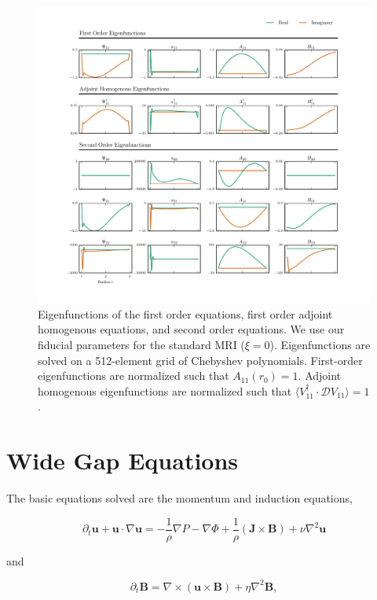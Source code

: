 \documentclass{emulateapj}
\newcommand{\beq}{\begin{equation}}
\newcommand{\eeq}{\end{equation}}
\begin{document}
\begin{figure}
\centering
\includegraphics[width=\textwidth]{../figures/widegap_orders1_2_Pm16E-7.pdf}
\caption{Eigenfunctions of the first order equations, first order adjoint homogenous equations, and second order equations. We use our fiducial parameters for the standard MRI ($\xi = 0$). Eigenfunctions are solved on a 512-element grid of Chebyshev polynomials. First-order eigenfunctions are normalized such that $A_{11}(r_0) = 1$. Adjoint homogenous eigenfunctions are normalized such that $\langle V_{11}^\dagger \cdot \mathcal{D} V_{11} \rangle = 1$.}\label{fig:linear_eigenfunctions}
\end{figure}

\section{Wide Gap Equations}

The basic equations solved are the momentum and induction equations,

\beq\label{momentum}
\partial_t \mathbf{u} + \mathbf{u} \cdot \nabla \mathbf{u} = -\frac{1}{\rho}\nabla P - \nabla\Phi + \frac{1}{\rho} \left(\mathbf{J}\times\mathbf{B}\right) + \nu\nabla^2 \mathbf{u} 
\eeq

and

\beq\label{induction}
\partial_t \mathbf{B} = \nabla \times \left(\mathbf{u} \times \mathbf{B}\right) + \eta\nabla^2\mathbf{B},
\eeq
\end{document}
